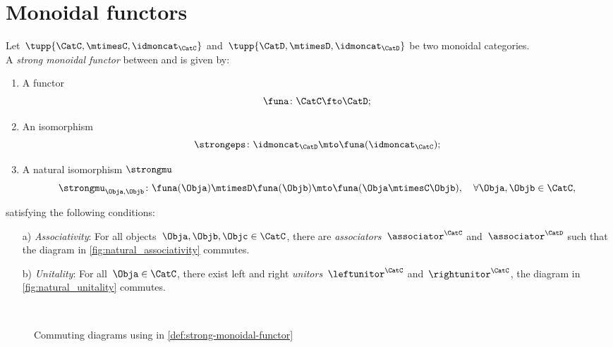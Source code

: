 
\section{Monoidal functors}
\label{sec:monoidal-functors}
\begin{ctdefinition}
	\label{def:strong-monoidal-functor}
	Let~$\tupp{\CatC,\mtimesC,\idmoncat_{\CatC}}$ and~$\tupp{\CatD,\mtimesD,\idmoncat_{\CatD}}$ be two monoidal categories.
	\\
	A \emph{strong monoidal functor} between \CatC and \CatD is given by:
	\begin{enumerate}
		\item A functor
		      \begin{equation}
			      \funa \colon \CatC \fto \CatD;
		      \end{equation}
		\item An isomorphism
		      \begin{equation}
			      \strongeps\colon \idmoncat_{\CatD}\mto \funa(\idmoncat_{\CatC});
		      \end{equation}
		\item A natural isomorphism $\strongmu$
		      \begin{equation}
			      \strongmu_{\Obja,\Objb}\colon \funa(\Obja)\mtimesD \funa(\Objb) \mto \funa(\Obja \mtimesC \Objb),\quad \forall \Obja,\Objb\in \CatC,
		      \end{equation}
	\end{enumerate}
	satisfying the following conditions:
	\begin{enumerate}
		\item[a)] \emph{Associativity}: For all objects~$\Obja,\Objb,\Objc\in \CatC$, there are  \emph{associators}~$\associator^\CatC$ and~$\associator^\CatD$ such that the diagram in \cref{fig:natural_associativity} commutes.
		\item[b)] \emph{Unitality}: For all~$\Obja\in \CatC$, there exist left and right \emph{unitors}~$\leftunitor^\CatC$ and~$\rightunitor^\CatC$, the diagram in
		      \cref{fig:natural_unitality} commutes.
	\end{enumerate}
\end{ctdefinition}
\begin{figure*}
	\\
	\caption{Commuting diagrams using in \cref{def:strong-monoidal-functor}}
	\label{fig:strong-monoidal-functor}
\end{figure*}
